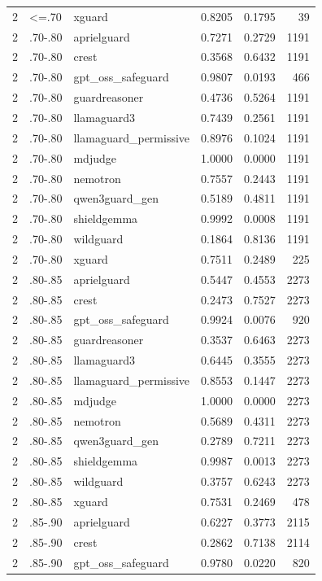 \begin{tabular}{rllrrr}
2 & <=.70 & xguard & 0.8205 & 0.1795 & 39 \\
2 & .70-.80 & aprielguard & 0.7271 & 0.2729 & 1191 \\
2 & .70-.80 & crest & 0.3568 & 0.6432 & 1191 \\
2 & .70-.80 & gpt\_oss\_safeguard & 0.9807 & 0.0193 & 466 \\
2 & .70-.80 & guardreasoner & 0.4736 & 0.5264 & 1191 \\
2 & .70-.80 & llamaguard3 & 0.7439 & 0.2561 & 1191 \\
2 & .70-.80 & llamaguard\_permissive & 0.8976 & 0.1024 & 1191 \\
2 & .70-.80 & mdjudge & 1.0000 & 0.0000 & 1191 \\
2 & .70-.80 & nemotron & 0.7557 & 0.2443 & 1191 \\
2 & .70-.80 & qwen3guard\_gen & 0.5189 & 0.4811 & 1191 \\
2 & .70-.80 & shieldgemma & 0.9992 & 0.0008 & 1191 \\
2 & .70-.80 & wildguard & 0.1864 & 0.8136 & 1191 \\
2 & .70-.80 & xguard & 0.7511 & 0.2489 & 225 \\
2 & .80-.85 & aprielguard & 0.5447 & 0.4553 & 2273 \\
2 & .80-.85 & crest & 0.2473 & 0.7527 & 2273 \\
2 & .80-.85 & gpt\_oss\_safeguard & 0.9924 & 0.0076 & 920 \\
2 & .80-.85 & guardreasoner & 0.3537 & 0.6463 & 2273 \\
2 & .80-.85 & llamaguard3 & 0.6445 & 0.3555 & 2273 \\
2 & .80-.85 & llamaguard\_permissive & 0.8553 & 0.1447 & 2273 \\
2 & .80-.85 & mdjudge & 1.0000 & 0.0000 & 2273 \\
2 & .80-.85 & nemotron & 0.5689 & 0.4311 & 2273 \\
2 & .80-.85 & qwen3guard\_gen & 0.2789 & 0.7211 & 2273 \\
2 & .80-.85 & shieldgemma & 0.9987 & 0.0013 & 2273 \\
2 & .80-.85 & wildguard & 0.3757 & 0.6243 & 2273 \\
2 & .80-.85 & xguard & 0.7531 & 0.2469 & 478 \\
2 & .85-.90 & aprielguard & 0.6227 & 0.3773 & 2115 \\
2 & .85-.90 & crest & 0.2862 & 0.7138 & 2114 \\
2 & .85-.90 & gpt\_oss\_safeguard & 0.9780 & 0.0220 & 820 \\

\end{tabular}
